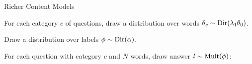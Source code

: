 \begin{frame}{Richer Content Models}

\begin{enumerate*}
  \item For each category $c$ of questions, draw a distribution over words
    \alert<4>{$\theta_c \sim \mbox{Dir}(\lambda_1 \theta_0)$}.
  \item Draw a distribution over labels $\phi \sim \mbox{Dir}(\alpha)$.
  \item For each question with category $c$ and $N$ words, draw answer $l \sim \mbox{Mult}( \phi)$:
\end{enumerate*}


\end{frame}

